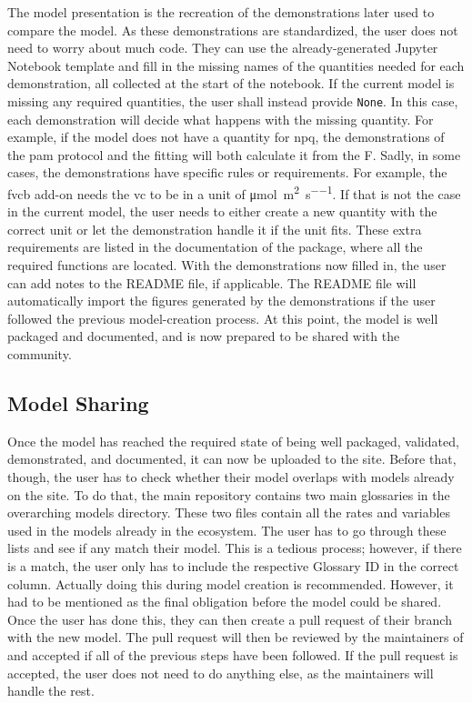 The model presentation is the recreation of the demonstrations later used to compare the model. As these demonstrations are standardized, the user does not need to worry about much code. They can use the already-generated Jupyter Notebook template and fill in the missing names of the quantities needed for each demonstration, all collected at the start of the notebook. If the current model is missing any required quantities, the user shall instead provide \verb|None|. In this case, each demonstration will decide what happens with the missing quantity. For example, if the model does not have a quantity for \gls{npq}, the demonstrations of the \gls{pam} protocol and the fitting will both calculate it from the \gls{F}. Sadly, in some cases, the demonstrations have specific rules or requirements. For example, the \gls{fvcb} add-on needs the \gls{vc} to be in a unit of \unit{\micro\mol\per\meter\squared\per\second}. If that is not the case in the current model, the user needs to either create a new quantity with the correct unit or let the demonstration handle it if the unit fits. These extra requirements are listed in the documentation of the \greensloth[GreenSlothUtils] package, where all the required functions are located. With the demonstrations now filled in, the user can add notes to the README file, if applicable. The README file will automatically import the figures generated by the demonstrations if the user followed the previous model-creation process. At this point, the model is well packaged and documented, and is now prepared to be shared with the community.

\subsection{Model Sharing}\label{sec:howto-sharing}

Once the model has reached the required state of being well packaged, validated, demonstrated, and documented, it can now be uploaded to the site. Before that, though, the user has to check whether their model overlaps with models already on the site. To do that, the main \greensloth{} repository contains two main glossaries in the overarching models directory. These two files contain all the rates and variables used in the models already in the ecosystem. The user has to go through these lists and see if any match their model. This is a tedious process; however, if there is a match, the user only has to include the respective Glossary ID in the correct column. Actually doing this during model creation is recommended. However, it had to be mentioned as the final obligation before the model could be shared. Once the user has done this, they can then create a pull request of their branch with the new model. The pull request will then be reviewed by the maintainers of \greensloth{} and accepted if all of the previous steps have been followed. If the pull request is accepted, the user does not need to do anything else, as the maintainers will handle the rest.

